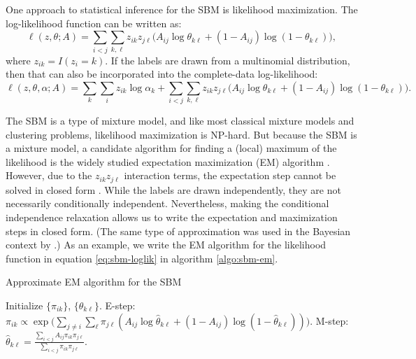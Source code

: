 \documentclass[
  12pt,
]{article}
\theoremstyle{definition}
\theoremstyle{definition}
\theoremstyle{definition}
\theoremstyle{definition}
\theoremstyle{remark}
\begin{document}
One approach to statistical inference for the SBM is likelihood maximization.
The log-likelihood function can be written as:
\begin{equation}
\label{eq:sbm-loglik}
\ell(z, \theta; A) = \sum_{i < j} \sum_{k, \ell} z_{ik} z_{j \ell} \big( 
A_{ij} \log \theta_{k \ell} + (1 - A_{ij}) \log (1 - \theta_{k \ell}) \big),
\end{equation}
where \(z_{ik} = I(z_i = k)\). If the labels are drawn from a multinomial distribution, then that can also be incorporated into the complete-data log-likelihood:
\begin{equation}
\label{eq:sbm-loglik-full}
\ell(z, \theta, \alpha; A) = \sum_k \sum_i z_{ik} \log \alpha_k + 
\sum_{i < j} \sum_{k, \ell} z_{ik} z_{j \ell} \big( 
A_{ij} \log \theta_{k \ell} + (1 - A_{ij}) \log (1 - \theta_{k \ell}) \big).
\end{equation}

The SBM is a type of mixture model, and like most classical mixture models and clustering problems, likelihood maximization is NP-hard.
But because the SBM is a mixture model, a candidate algorithm for finding a (local) maximum of the likelihood is the widely studied expectation maximization (EM) algorithm \citep{10.2307/2984875}.
However, due to the \(z_{ik} z_{j \ell}\) interaction terms, the expectation step cannot be solved in closed form \citep{kolaczyk2014statistical}.
While the labels are drawn independently, they are not necessarily conditionally independent.
Nevertheless, making the conditional independence relaxation allows us to write the expectation and maximization steps in closed form.
(The same type of approximation was used in the Bayesian context by \citet{10.2307/43974715}.)
As an example, we write the EM algorithm for the likelihood function in equation \eqref{eq:sbm-loglik} in algorithm \ref{algo:sbm-em}.

\begin{algorithm}
  \label{algo:sbm-em}
  \DontPrintSemicolon
  \SetAlgoLined
  \caption{Approximate EM algorithm for the SBM}
  Initialize $\{\pi_{ik}\}$, $\{\theta_{k \ell}\}$.\;
  \While{$\|\nabla \ell\| > \epsilon$} {
     {
       {
      E-step: $\pi_{ik} \propto \exp \bigg( \sum_{j \neq i} \sum_{\ell} \pi_{j \ell} (A_{ij} \log \hat{\theta}_{k \ell} + (1 - A_{ij}) \log (1 - \hat{\theta}_{k \ell})) \bigg)$.\;
      }
    }
     {
       {
        M-step: $\hat{\theta}_{k \ell} = \frac{\sum_{i < j} A_{ij} \pi_{ik} \pi_{j \ell}}{\sum_{i < j} \pi_{ik} \pi_{j \ell}}$.\;
      }
    }
  }
\end{algorithm}
\end{document}
